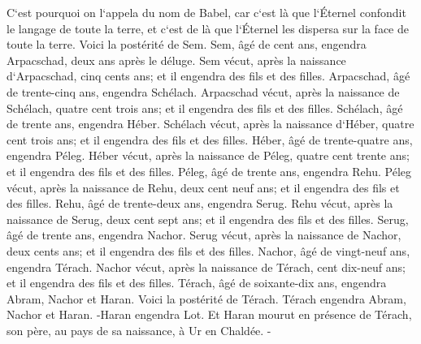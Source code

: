 \verse C`est pourquoi on l`appela du nom de Babel, car c`est là que l`Éternel confondit le langage de toute la terre, et c`est de là que l`Éternel les dispersa sur la face de toute la terre. 
\verse Voici la postérité de Sem. Sem, âgé de cent ans, engendra Arpacschad, deux ans après le déluge. 
\verse Sem vécut, après la naissance d`Arpacschad, cinq cents ans; et il engendra des fils et des filles. 
\verse Arpacschad, âgé de trente-cinq ans, engendra Schélach. 
\verse Arpacschad vécut, après la naissance de Schélach, quatre cent trois ans; et il engendra des fils et des filles. 
\verse Schélach, âgé de trente ans, engendra Héber. 
\verse Schélach vécut, après la naissance d`Héber, quatre cent trois ans; et il engendra des fils et des filles. 
\verse Héber, âgé de trente-quatre ans, engendra Péleg. 
\verse Héber vécut, après la naissance de Péleg, quatre cent trente ans; et il engendra des fils et des filles. 
\verse Péleg, âgé de trente ans, engendra Rehu. 
\verse Péleg vécut, après la naissance de Rehu, deux cent neuf ans; et il engendra des fils et des filles. 
\verse Rehu, âgé de trente-deux ans, engendra Serug. 
\verse Rehu vécut, après la naissance de Serug, deux cent sept ans; et il engendra des fils et des filles. 
\verse Serug, âgé de trente ans, engendra Nachor. 
\verse Serug vécut, après la naissance de Nachor, deux cents ans; et il engendra des fils et des filles. 
\verse Nachor, âgé de vingt-neuf ans, engendra Térach. 
\verse Nachor vécut, après la naissance de Térach, cent dix-neuf ans; et il engendra des fils et des filles. 
\verse Térach, âgé de soixante-dix ans, engendra Abram, Nachor et Haran. 
\verse Voici la postérité de Térach. Térach engendra Abram, Nachor et Haran. -Haran engendra Lot. 
\verse Et Haran mourut en présence de Térach, son père, au pays de sa naissance, à Ur en Chaldée. - 
